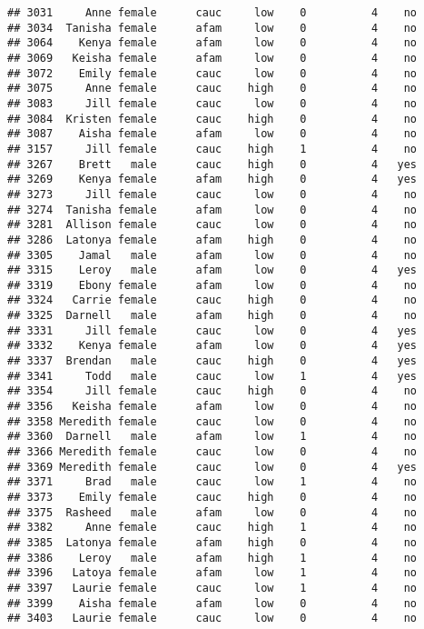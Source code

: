 \documentclass[
]{article}
\begin{document}
\begin{verbatim}
## 3031     Anne female      cauc     low    0          4    no
## 3034  Tanisha female      afam     low    0          4    no
## 3064    Kenya female      afam     low    0          4    no
## 3069   Keisha female      afam     low    0          4    no
## 3072    Emily female      cauc     low    0          4    no
## 3075     Anne female      cauc    high    0          4    no
## 3083     Jill female      cauc     low    0          4    no
## 3084  Kristen female      cauc    high    0          4    no
## 3087    Aisha female      afam     low    0          4    no
## 3157     Jill female      cauc    high    1          4    no
## 3267    Brett   male      cauc    high    0          4   yes
## 3269    Kenya female      afam    high    0          4   yes
## 3273     Jill female      cauc     low    0          4    no
## 3274  Tanisha female      afam     low    0          4    no
## 3281  Allison female      cauc     low    0          4    no
## 3286  Latonya female      afam    high    0          4    no
## 3305    Jamal   male      afam     low    0          4    no
## 3315    Leroy   male      afam     low    0          4   yes
## 3319    Ebony female      afam     low    0          4    no
## 3324   Carrie female      cauc    high    0          4    no
## 3325  Darnell   male      afam    high    0          4    no
## 3331     Jill female      cauc     low    0          4   yes
## 3332    Kenya female      afam     low    0          4   yes
## 3337  Brendan   male      cauc    high    0          4   yes
## 3341     Todd   male      cauc     low    1          4   yes
## 3354     Jill female      cauc    high    0          4    no
## 3356   Keisha female      afam     low    0          4    no
## 3358 Meredith female      cauc     low    0          4    no
## 3360  Darnell   male      afam     low    1          4    no
## 3366 Meredith female      cauc     low    0          4    no
## 3369 Meredith female      cauc     low    0          4   yes
## 3371     Brad   male      cauc     low    1          4    no
## 3373    Emily female      cauc    high    0          4    no
## 3375  Rasheed   male      afam     low    0          4    no
## 3382     Anne female      cauc    high    1          4    no
## 3385  Latonya female      afam    high    0          4    no
## 3386    Leroy   male      afam    high    1          4    no
## 3396   Latoya female      afam     low    1          4    no
## 3397   Laurie female      cauc     low    1          4    no
## 3399    Aisha female      afam     low    0          4    no
## 3403   Laurie female      cauc     low    0          4    no

\end{verbatim}
\end{document}

